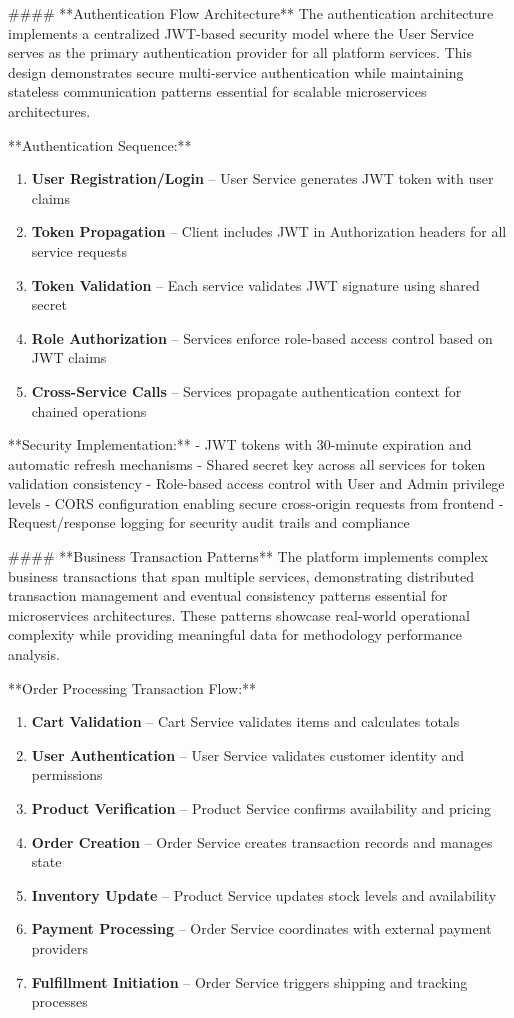 #### **Authentication Flow Architecture**
The authentication architecture implements a centralized JWT-based security model where the User Service serves as the primary authentication provider for all platform services. This design demonstrates secure multi-service authentication while maintaining stateless communication patterns essential for scalable microservices architectures.

**Authentication Sequence:**
\begin{enumerate}
\item \textbf{User Registration/Login} -- User Service generates JWT token with user claims
\item \textbf{Token Propagation} -- Client includes JWT in Authorization headers for all service requests
\item \textbf{Token Validation} -- Each service validates JWT signature using shared secret
\item \textbf{Role Authorization} -- Services enforce role-based access control based on JWT claims
\item \textbf{Cross-Service Calls} -- Services propagate authentication context for chained operations
\end{enumerate}

**Security Implementation:**
- JWT tokens with 30-minute expiration and automatic refresh mechanisms
- Shared secret key across all services for token validation consistency
- Role-based access control with User and Admin privilege levels
- CORS configuration enabling secure cross-origin requests from frontend
- Request/response logging for security audit trails and compliance

#### **Business Transaction Patterns**
The platform implements complex business transactions that span multiple services, demonstrating distributed transaction management and eventual consistency patterns essential for microservices architectures. These patterns showcase real-world operational complexity while providing meaningful data for methodology performance analysis.

**Order Processing Transaction Flow:**
\begin{enumerate}
\item \textbf{Cart Validation} -- Cart Service validates items and calculates totals
\item \textbf{User Authentication} -- User Service validates customer identity and permissions
\item \textbf{Product Verification} -- Product Service confirms availability and pricing
\item \textbf{Order Creation} -- Order Service creates transaction records and manages state
\item \textbf{Inventory Update} -- Product Service updates stock levels and availability
\item \textbf{Payment Processing} -- Order Service coordinates with external payment providers
\item \textbf{Fulfillment Initiation} -- Order Service triggers shipping and tracking processes
\end{enumerate}

